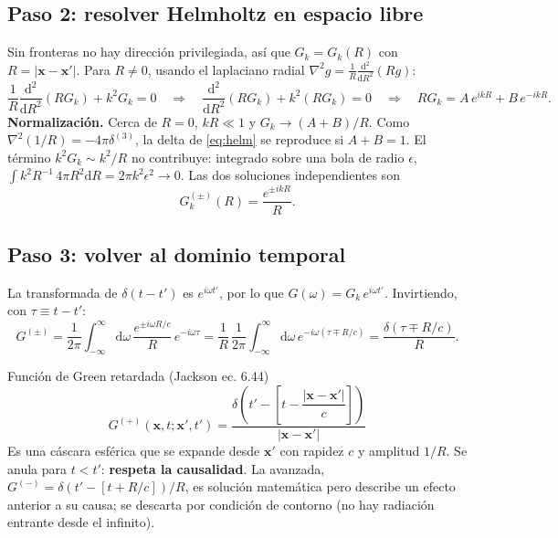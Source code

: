 \documentclass[11pt,a4paper]{article}
\newcommand{\dd}{\mathrm d}
\theoremstyle{remark}
\begin{document}
\subsection{Paso 2: resolver Helmholtz en espacio libre}

Sin fronteras no hay dirección privilegiada, así que $G_k=G_k(R)$ con $R=|\mathbf x-\mathbf x'|$.
Para $R\neq0$, usando el laplaciano radial $\nabla^2g=\frac1R\frac{\dd^2}{\dd R^2}(Rg)$:
\[
\frac1R\frac{\dd^2}{\dd R^2}(RG_k)+k^2G_k=0
\quad\Longrightarrow\quad
\frac{\dd^2}{\dd R^2}(RG_k)+k^2(RG_k)=0
\quad\Longrightarrow\quad
RG_k=A\,e^{ikR}+B\,e^{-ikR}.
\]
\textbf{Normalización.} Cerca de $R=0$, $kR\ll1$ y $G_k\to(A+B)/R$. Como
$\nabla^2(1/R)=-4\pi\delta^{(3)}$, la delta de \eqref{eq:helm} se reproduce si $A+B=1$. El término
$k^2G_k\sim k^2/R$ no contribuye: integrado sobre una bola de radio $\epsilon$,
$\int k^2R^{-1}\,4\pi R^2\dd R=2\pi k^2\epsilon^2\to0$. Las dos soluciones independientes son
\begin{equation}
G_k^{(\pm)}(R)=\frac{e^{\pm ikR}}{R}.
\end{equation}

\subsection{Paso 3: volver al dominio temporal}

La transformada de $\delta(t-t')$ es $e^{i\omega t'}$, por lo que $G(\omega)=G_k\,e^{i\omega t'}$.
Invirtiendo, con $\tau\equiv t-t'$:
\begin{equation}
G^{(\pm)}=\frac1{2\pi}\int_{-\infty}^{\infty}\dd\omega\,\frac{e^{\pm i\omega R/c}}{R}\,e^{-i\omega\tau}
=\frac1R\,\frac1{2\pi}\int_{-\infty}^{\infty}\dd\omega\,e^{-i\omega(\tau\mp R/c)}
=\frac{\delta(\tau\mp R/c)}{R}.
\end{equation}

\begin{resbox}{Función de Green retardada (Jackson ec. 6.44)}
\begin{equation}
G^{(+)}(\mathbf x,t;\mathbf x',t')=\frac{\delta\!\left(t'-\left[t-\dfrac{|\mathbf x-\mathbf x'|}{c}\right]\right)}{|\mathbf x-\mathbf x'|}
\label{eq:Gret}
\end{equation}
Es una cáscara esférica que se expande desde $\mathbf x'$ con rapidez $c$ y amplitud $1/R$. Se anula
para $t<t'$: \textbf{respeta la causalidad}. La avanzada, $G^{(-)}=\delta(t'-[t+R/c])/R$, es solución
matemática pero describe un efecto anterior a su causa; se descarta por condición de contorno
(no hay radiación entrante desde el infinito).
\end{resbox}
\end{document}
